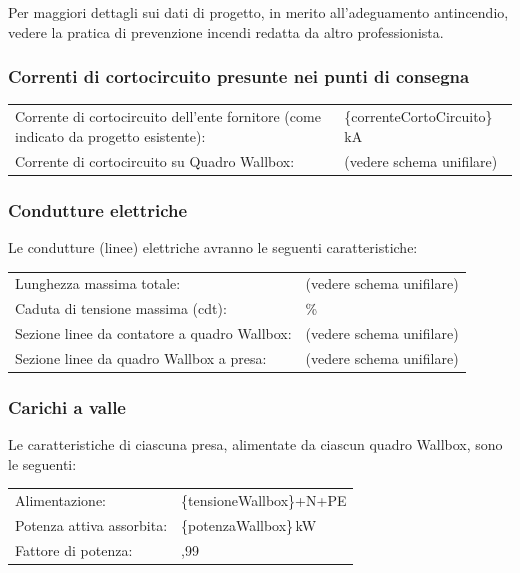 Per maggiori dettagli sui dati di progetto, in merito all’adeguamento antincendio, vedere la pratica di prevenzione incendi redatta da altro professionista.    

\subsubsection{Correnti di cortocircuito presunte nei punti di consegna }
\begin{center}
\begin{tabularx}{\textwidth}{>{\raggedright\arraybackslash}p{} >{\raggedright\arraybackslash}X}
Corrente di cortocircuito dell'ente fornitore (come indicato da progetto esistente): & \{correnteCortoCircuito\}\,kA \\
Corrente di cortocircuito su Quadro Wallbox: & (vedere schema unifilare) \\
\end{tabularx}
\end{center}


\subsubsection{Condutture elettriche}
Le condutture (linee) elettriche avranno le seguenti caratteristiche:

\begin{center}
\begin{tabularx}{\textwidth}{>{\raggedright\arraybackslash}p{} >{\raggedright\arraybackslash}X}
Lunghezza massima totale:                    & (vedere schema unifilare) \\
Caduta di tensione massima (cdt):            & 4\% \\
Sezione linee da contatore a quadro Wallbox: & (vedere schema unifilare) \\
Sezione linee da quadro Wallbox a presa:      & (vedere schema unifilare) \\
\end{tabularx}
\end{center}

\subsubsection{Carichi a valle}
Le caratteristiche di ciascuna presa, alimentate da ciascun quadro Wallbox, sono le seguenti:

\begin{center}
\begin{tabularx}{\textwidth}{>{\raggedright\arraybackslash}p{} >{\raggedright\arraybackslash}X}
Alimentazione:           & \{tensioneWallbox\}+N+PE \\
Potenza attiva assorbita: & \{potenzaWallbox\}\,kW \\
Fattore di potenza:       & 0,99 \\
\end{tabularx}
\end{center}




